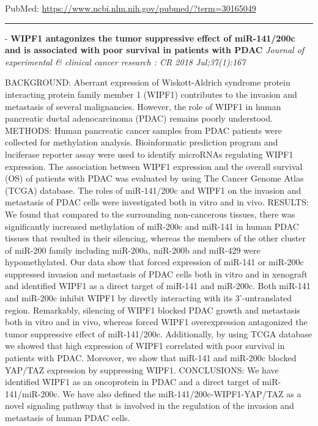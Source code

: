 \documentclass[]{article}
\begin{document}
PubMed: \url{https://www.ncbi.nlm.nih.gov/pubmed/?term=30165049}

{}

{}

\begin{center}\rule{0.5\linewidth}{\linethickness}\end{center}

 - \textbf{WIPF1 antagonizes the tumor suppressive effect of
miR-141/200c and is associated with poor survival in patients with PDAC}
\emph{Journal of experimental \& clinical cancer research : CR 2018
Jul;37(1):167}

BACKGROUND: Aberrant expression of Wiskott-Aldrich syndrome protein
interacting protein family member 1 (WIPF1) contributes to the invasion
and metastasis of several malignancies. However, the role of WIPF1 in
human pancreatic ductal adenocarcinoma (PDAC) remains poorly understood.
METHODS: Human pancreatic cancer samples from PDAC patients were
collected for methylation analysis. Bioinformatic prediction program and
luciferase reporter assay were used to identify microRNAs regulating
WIPF1 expression. The association between WIPF1 expression and the
overall survival (OS) of patients with PDAC was evaluated by using The
Cancer Genome Atlas (TCGA) database. The roles of miR-141/200c and WIPF1
on the invasion and metastasis of PDAC cells were investigated both in
vitro and in vivo. RESULTS: We found that compared to the surrounding
non-cancerous tissues, there was significantly increased methylation of
miR-200c and miR-141 in human PDAC tissues that resulted in their
silencing, whereas the members of the other cluster of miR-200 family
including miR-200a, miR-200b and miR-429 were hypomethylated. Our data
show that forced expression of miR-141 or miR-200c suppressed invasion
and metastasis of PDAC cells both in vitro and in xenograft and
identified WIPF1 as a direct target of miR-141 and miR-200c. Both
miR-141 and miR-200c inhibit WIPF1 by directly interacting with its
3'-untranslated region. Remarkably, silencing of WIPF1 blocked PDAC
growth and metastasis both in vitro and in vivo, whereas forced WIPF1
overexpression antagonized the tumor suppressive effect of miR-141/200c.
Additionally, by using TCGA database we showed that high expression of
WIPF1 correlated with poor survival in patients with PDAC. Moreover, we
show that miR-141 and miR-200c blocked YAP/TAZ expression by suppressing
WIPF1. CONCLUSIONS: We have identified WIPF1 as an oncoprotein in PDAC
and a direct target of miR-141/miR-200c. We have also defined the
miR-141/200c-WIPF1-YAP/TAZ as a novel signaling pathway that is involved
in the regulation of the invasion and metastasis of human PDAC cells.
\end{document}
